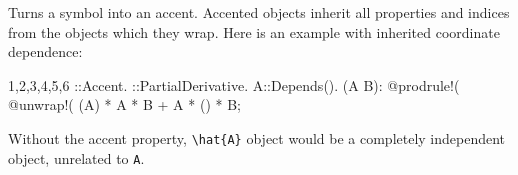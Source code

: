 
Turns a symbol into an accent. Accented objects inherit all properties
and indices from the objects which they wrap. Here is an example with
inherited coordinate dependence:
\begin{screen}{1,2,3,4,5,6}
\hat{#}::Accent.
\partial{#}::PartialDerivative.
A::Depends(\partial).
\partial(A  B):
@prodrule!(%
@unwrap!(%
\partial(A) * A * B + A * \partial() * B;
\end{screen}
Without the accent property, \verb|\hat{A}| object would be a
completely independent object, unrelated to \verb|A|.


